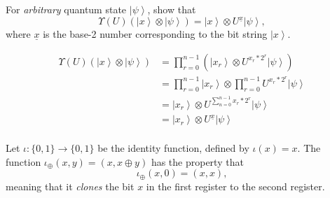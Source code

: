 \documentclass{exam} %
\theoremstyle{plain}
\theoremstyle{definition}
\theoremstyle{remark}
\numberwithin{equation}{section}  %
\newcommand{\ket}[1]{ \left| #1 \right> }
\begin{document}
\begin{questions}
For \emph{arbitrary} quantum state $\ket{\psi}$, show that
\[
  \Upsilon(U)(\ket{x}\otimes \ket{\psi}) 
   = \ket{x}\otimes U^{\underline{x}} \ket{\psi},
\]
where $\underline{x}$ is the base-2 number corresponding to the bit string
$\ket{x}$.
\begin{solution}
  \begin{align*}
    \Upsilon(U)(\ket{x}\otimes \ket{\psi}) 
    &=
    \prod_{r=0}^{n-1}(\ket{x_r} \otimes U^{x_r * 2^r}\ket{\psi}) \\
    &=
    \prod_{r=0}^{n-1}\ket{x_r} \otimes \prod_{r=0}^{n-1}U^{x_r * 2^r}\ket{\psi}\\
    &=
    \ket{x_r} \otimes U^{\sum_{n=0}^{n-1} x_r * 2^r}\ket{\psi}\\
    &=
    \ket{x_r} \otimes U^{\underline{x}}\ket{\psi}\\
  \end{align*}
\end{solution}
\question Let $\iota: \{0,1\} \to \{0,1\}$ be the identity function, defined
by $\iota(x) = x$. The function $\iota_{\oplus}(x,y) = (x, x\oplus y)$ has
the property that
\[
  \iota_{\oplus}(x,0)
  = (x, x),
\]
meaning that it \emph{clones} the bit $x$ in the first register to the
second register.

\bigskip


\end{questions}
\end{document}
